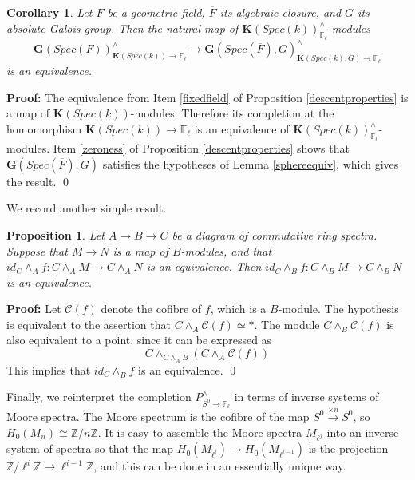 \documentclass[11pt]{article}
\newcommand\mb{\mathbb}
\newcommand\mc{\mathcal}
\def \bK{\mathbf K}
\newcommand\mfk{\mathbf G}
\newtheorem{Proposition}{Proposition}[section]
\newtheorem{Corollary}{Corollary}[section]
\newenvironment{Proof}{\par\noindent\textbf{Proof:}}
{\qed}
\begin{document}
 \begin{Corollary}\label{finalcriterion} Let $F$ be a geometric field, $\overline{F}$ its algebraic closure, and $G$ its absolute Galois group.  Then the natural map of $\bK(Spec(k))^{\wedge} _{\mb{F}_{\ell}}$-modules  
      $$\mfk(Spec(F))^{\wedge}_{\bK(Spec(k))\rightarrow \mb{F}_{\ell}} \rightarrow \mfk(Spec(\overline{F}), G)^{\wedge}_{\bK(Spec(k), G)\rightarrow \mb{F}_{\ell}}$$is an equivalence.   
 \end{Corollary}
 \begin{Proof}  The equivalence from Item \ref{fixedfield} of Proposition \ref{descentproperties} is a map of $\bK(Spec(k))$-modules. Therefore its  completion at the homomorphism $\bK(Spec(k))\rightarrow \mb{F}_{\ell}$ is an equivalence of $\bK(Spec(k))^{\wedge}_{\mb{F}_{\ell}}$-modules.   Item \ref{zeroness}  of Proposition \ref{descentproperties} shows that $\mfk(Spec(\overline{F}), G) $ satisfies the hypotheses of Lemma \ref{sphereequiv}, which gives the result.  
 \end{Proof} 

 We record another simple result. 
 \begin{Proposition} \label{transfercompletion} Let $A \rightarrow B \rightarrow C $ be a diagram of commutative ring spectra.  Suppose that $M \rightarrow N$ is a map of $B$-modules, and that $id _C \wedge _A f: C \wedge _A M \rightarrow C \wedge _AN$ is an equivalence.  Then $id_C \wedge _Bf:C \wedge_{B}  M \rightarrow  C \wedge _B N$ is an equivalence.  
 \end{Proposition}
\begin{Proof}
 Let $\mc{C}(f) $ denote the cofibre of $f$, which is a $B$-module.  The hypothesis is equivalent to the assertion that  $C \wedge _A\mc{C}(f) \simeq *$. The module $C \wedge _B\mc{C}(f)$ is also equivalent to a point, since it can be expressed as 
 $$ C \wedge _{C \wedge _A B} (C \wedge _A \mc{C}(f)) 
 $$
 This implies that $id_C \wedge_B f$ is an equivalence.  
\end{Proof}

Finally, we  reinterpret the completion $P^{\wedge}_{S^0 \rightarrow \mb{F}_{\ell}}$ in terms of inverse systems of Moore spectra.  The Moore spectrum is the cofibre of the map $S^0 \xrightarrow{\times n} S^0$, so $H_0(M_n) \cong\mb{Z}/n \mb{Z}$.  It is easy to assemble the Moore spectra $M_{\ell ^j}$ into an inverse system of spectra so that the map $H_0(M_{\ell ^i}) \rightarrow H_0(M_{\ell  ^{i-1}})$ is the projection $\mb{Z} / \ell^{i}\mb{Z} \rightarrow \ell^{i-1}\mb{Z} $, and this can be done in an essentially unique way. 
\end{document}
